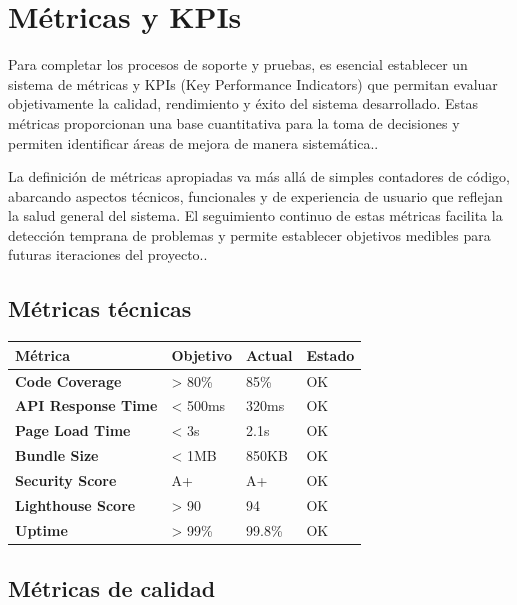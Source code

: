 \documentclass[12pt,a4paper,oneside]{report}
\begin{document}
\section{Métricas y KPIs}\label{muxe9tricas-y-kpis}

Para completar los procesos de soporte y pruebas, es esencial establecer
un sistema de métricas y KPIs (Key Performance Indicators) que permitan
evaluar objetivamente la calidad, rendimiento y éxito del sistema
desarrollado. Estas métricas proporcionan una base cuantitativa para la
toma de decisiones y permiten identificar áreas de mejora de manera
sistemática..

La definición de métricas apropiadas va más allá de simples contadores
de código, abarcando aspectos técnicos, funcionales y de experiencia de
usuario que reflejan la salud general del sistema. El seguimiento
continuo de estas métricas facilita la detección temprana de problemas y
permite establecer objetivos medibles para futuras iteraciones del
proyecto..

\subsection{Métricas técnicas}\label{muxe9tricas-tuxe9cnicas}

\begin{longtable}[]{@{}llll@{}}
\toprule\noalign{}
Métrica & Objetivo & Actual & Estado \\
\midrule\noalign{}
\endhead
\bottomrule\noalign{}
\endlastfoot
\textbf{Code Coverage} & \textgreater{} 80\% & 85\% & OK \\
\textbf{API Response Time} & \textless{} 500ms & 320ms & OK \\
\textbf{Page Load Time} & \textless{} 3s & 2.1s & OK \\
\textbf{Bundle Size} & \textless{} 1MB & 850KB & OK \\
\textbf{Security Score} & A+ & A+ & OK \\
\textbf{Lighthouse Score} & \textgreater{} 90 & 94 & OK \\
\textbf{Uptime} & \textgreater{} 99\% & 99.8\% & OK \\
\end{longtable}

\subsection{Métricas de calidad}\label{muxe9tricas-de-calidad}
\end{document}
